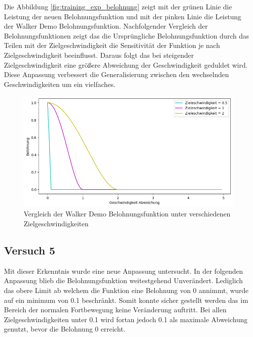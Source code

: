 Die Abbildung \ref{fig:training_exp_belohnung} zeigt mit der grünen Linie die Leistung der neuen Belohnungsfunktion und mit der pinken Linie die Leistung der Walker Demo Belohnungsfunktion. Nachfolgender Vergleich der Belohnungsfunktionen zeigt das die Ursprüngliche Belohnungsfunktion durch das Teilen mit der Zielgeschwindigkeit die Sensitivität der Funktion je nach Zielgeschwindigkeit beeinflusst. Daraus folgt das bei steigender Zielgeschwindigkeit eine größere Abweichung der Geschwindigkeit geduldet wird. Diese Anpassung verbessert die Generalisierung zwischen den wechselnden Geschwindigkeiten um ein vielfaches.

\begin{figure}[H]
  \centering  
  \includegraphics[scale=0.5]{img/match_velocity_original_vergleich.png}
  \caption{Vergleich der Walker Demo Belohnungsfunktion unter verschiedenen Zielgeschwindigkeiten}
  \label{fig:match_velocity_original_vergleich}
\end{figure}

\subsection{Versuch 5}
Mit dieser Erkenntnis wurde eine neue Anpassung untersucht. In der folgenden Anpassung blieb die Belohnungsfunktion weitestgehend Unverändert. Lediglich das obere Limit ab welchem die Funktion eine Belohnung von 0 annimmt, wurde auf ein minimum von 0.1 beschränkt. Somit konnte sicher gestellt werden das im Bereich der normalen Fortbewegung keine Veränderung auftritt. Bei allen Zielgeschwindigkeiten unter 0.1 wird fortan jedoch 0.1 als maximale Abweichung genutzt, bevor die Belohnung 0 erreicht.\\

